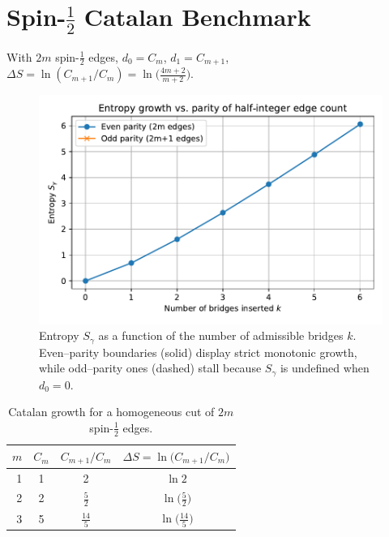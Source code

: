 \documentclass[11pt]{article}
\begin{document}

\section{Spin-$\tfrac12$ Catalan Benchmark}\label{sec:catalan}

\begin{corollary} With $2m$ spin-$\tfrac12$ edges, $d_0=C_m$, $d_1=C_{m+1}$, $\Delta S=\ln(C_{m+1}/C_m)=\ln\bigl(\tfrac{4m+2}{m+2}\bigr)$. \end{corollary}

\begin{figure}[!htbp]
  \centering
  \includegraphics[width=.7\linewidth]{figures/entropy_growth_even_vs_odd.pdf}%
  \caption{Entropy $S_\gamma$ as a function of the number of admissible
           bridges $k$.  Even–parity boundaries (solid) display strict
           monotonic growth, while odd–parity ones (dashed) stall because
           $S_\gamma$ is undefined when $d_0=0$.}
  \label{fig:entropyGrowth}
\end{figure}


\begin{table}[!htbp]
  \centering
  \caption{Catalan growth for a homogeneous cut of $2m$ spin-$\tfrac12$ edges.}
  \begin{tabular}{@{}rccc@{}}
    \toprule
    $m$ & $C_m$ & $C_{m+1}\!/C_m$ & $\Delta S=\ln\!\bigl(C_{m+1}\!/C_m\bigr)$ \\
    \midrule
     1 & 1 & 2          & $\ln 2$ \\
     2 & 2 & $\tfrac52$ & $\ln\!\bigl(\tfrac52\bigr)$ \\
     3 & 5 & $\tfrac{14}{5}$ & $\ln\!\bigl(\tfrac{14}{5}\bigr)$ \\
    \bottomrule
  \end{tabular}
\end{table}
\end{document}
